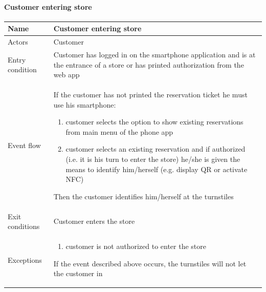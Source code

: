 \paragraph{Customer entering store}
\begin{flushleft}
	\begin{tabular} { | m{3cm} | m{10cm} | }
		\hline
		Name & Customer entering store\\
		\hline
		Actors & Customer\\
		\hline
		Entry condition & Customer has logged in on the smartphone application and is at the entrance of a store or has printed authorization from the web app\\
		\hline
		Event flow &
		If the customer has not printed the reservation ticket he must use his smartphone:
		\begin{enumerate}
			\item customer selects the option to show existing reservations from main menu of the phone app 
			\item customer selects an existing reservation and if authorized (i.e. it is his turn to enter the store) he/she is given the means to identify him/herself (e.g. display QR or activate NFC)
		\end{enumerate}
		Then the customer identifies him/herself at the turnstiles\\
		\hline
		Exit conditions & Customer enters the store\\
		\hline
		Exceptions & \begin{enumerate}
			\item customer is not authorized to enter the store
		\end{enumerate}
		If the event described above occurs, the turnstiles will not let the customer in\\
		\hline
	\end{tabular}
\end{flushleft}
\newpage
